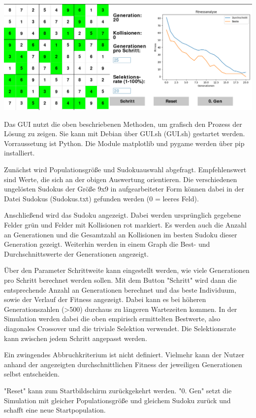 \includegraphics[width=\textwidth]{../Pictures/GUI.png}

\noindent Das GUI nutzt die oben beschriebenen Methoden, um grafisch den Prozess der Lösung zu zeigen. 
Sie kann mit Debian über GUI.sh (GUI.sh) gestartet werden.
Vorraussetung ist Python. Die Module matplotlib und pygame werden über pip installiert.

\noindent Zunächst wird Populationsgröße und Sudokuauswahl abgefragt. 
Empfehlenswert sind Werte, die sich an der obigen Auswertung orientieren.
Die verschiedenen ungelösten Sudokus der Größe 9x9 in aufgearbeiteter Form können dabei in der Datei Sudokus (Sudokus.txt) gefunden werden (0 = leeres Feld).

\noindent Anschließend wird das Sudoku angezeigt. Dabei werden ursprünglich gegebene Felder grün und Felder mit Kollisionen rot markiert. 
Es werden auch die Anzahl an Generationen und die Gesamtzahl an Kollisionen im besten Sudoku dieser Generation gezeigt. Weiterhin werden in einem Graph die Best- und Durchschnittswerte der Generationen angezeigt.

\noindent Über den Parameter Schrittweite kann eingestellt werden, wie viele Generationen pro Schritt berechnet werden sollen. 
Mit dem Button "Schritt" wird dann die entsprechende Anzahl an Generationen berechnet und das beste Individuum, sowie der Verlauf der Fitness angezeigt. Dabei kann es bei höheren Generationszahlen (>500) durchaus zu längeren Wartezeiten kommen.
\newpage
\noindent In der Simulation werden dabei die oben empirisch ermittelten Bestwerte, also diagonales Crossover und die triviale Selektion verwendet. Die Selektionsrate kann zwischen jedem Schritt angepasst werden.

\noindent Ein zwingendes Abbruchkriterium ist nicht definiert. Vielmehr kann der Nutzer anhand der angezeigten durchschnittlichen Fitness der jeweiligen Generationen selbst entscheiden.

 "Reset" kann zum Startbildschirm zurückgekehrt werden.
"0. Gen" setzt die Simulation mit gleicher Populationsgröße und gleichem Sudoku zurück und schafft eine neue Startpopulation.
